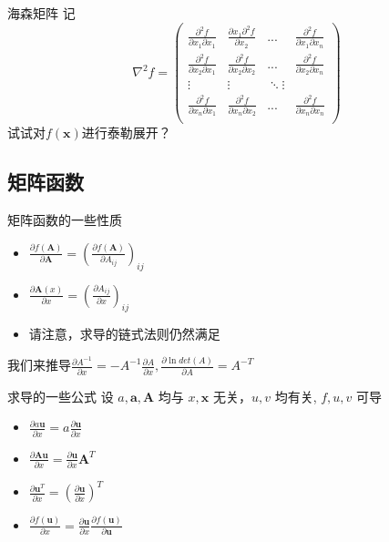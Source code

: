 \documentclass{ctexbeamer}
\begin{document}
\begin{frame}{海森矩阵}
    记
    $$\nabla^2 f = \left(\begin{array}{cccc}
         \frac{\partial^2 f}{\partial x_1\partial x_1}&\frac{\partial x_1\partial^2 f}{\partial x_2}&...&\frac{\partial^2 f}{\partial x_1\partial x_n}\\
         \frac{\partial^2 f}{\partial x_2\partial x_1}&\frac{\partial^2 f}{\partial x_2\partial x_2}&...&\frac{\partial^2 f}{\partial x_2\partial x_n}\\
         \vdots&\vdots&\ddots\vdots\\
         \frac{\partial^2 f}{\partial x_n\partial x_1}&\frac{ \partial^2 f}{\partial x_n\partial x_2}&...&\frac{\partial^2 f}{\partial x_n\partial x_n}\\
        \end{array}\right)$$
试试对$f(\boldsymbol{x})$进行泰勒展开？
\end{frame}


\subsection{矩阵函数}
\begin{frame}{矩阵函数的一些性质}
\begin{itemize}
    \item $\frac{\partial f(\boldsymbol{A})}{\partial\boldsymbol{A}}= (\frac{\partial f(\boldsymbol{A})}{\partial A_{ij}})_{ij} $
    \item $\frac{\partial \boldsymbol{A}(x)}{\partial x}= (\frac{\partial A_{ij}}{\partial x})_{ij} $
    \item 请注意，求导的链式法则仍然满足
\end{itemize}
我们来推导$\frac{\partial A^{-1}}{\partial x}=-A^{-1}\frac{\partial A}{\partial x}, \frac{\partial \ln det(A)}{\partial A} = A^{-T}$
    
\end{frame}
\begin{frame}{求导的一些公式}
设 $a, \boldsymbol{a,A}$ 均与 $x,\boldsymbol{x}$ 无关，$u,v$ 均有关, $f,u,v$ 可导
\begin{itemize}
    \item $\frac{\partial a\boldsymbol{u}}{\partial x} = a\frac{\partial \boldsymbol{u}}{\partial x}$
    \item $\frac{\partial \boldsymbol{Au}}{\partial x}=\frac{\partial \boldsymbol{u}}{\partial x}\boldsymbol{A}^T$
    \item $\frac{\partial \boldsymbol u^T}{\partial x}=(\frac{\partial \boldsymbol u}{\partial x})^T$
    \item $\frac{\partial f(\boldsymbol u)}{\partial x} = \frac{\partial \boldsymbol u}{\partial x}\frac{\partial f(\boldsymbol u)}{\partial \boldsymbol u}$
    
\end{itemize}
    
\end{frame}
\end{document}
